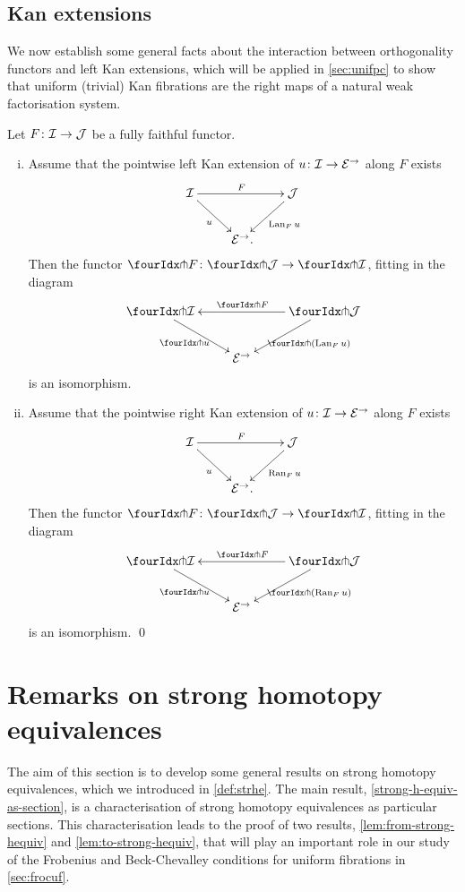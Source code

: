 \documentclass[reqno,10pt,a4paper,oneside,draft]{amsart}
\begin{document}
\subsection*{Kan extensions}

We now establish some general facts about the interaction between orthogonality functors and left Kan extensions, which will be applied in \cref{sec:unifpc} to show that uniform (trivial) Kan fibrations are the right maps of a natural weak factorisation system.

\begin{proposition} \label{kan-extension-closure}
Let $F \colon \mathcal{I} \to \mathcal{J}$ be a fully faithful functor.
\begin{enumerate}[(i)]
\item Assume that the pointwise left Kan extension of $u \colon \mathcal{I} \to \mathcal{E}^\to$ along $F$ exists
\[
\xymatrix{
  \cal{I}
  \ar[dr]_{u}
  \ar[rr]^{F}
&&
  \cal{J}
  \ar[dl]^{\Lan_F u}
\\&
  \catE^\to \rlap{.}
}
\]
Then the functor $\liftr{F} \co \liftr{\cal{J}} \to \liftr{\cal{I}}$, fitting in the diagram
\[
\xymatrix{
  \liftr{\cal{I}}
  \ar[dr]_{\liftr{u}}
&&
  \liftr{\cal{J}}
  \ar[ll]_{\liftr{F}}
  \ar[dl]^{\liftr{(\Lan_F u)}}
\\&
  \catE^\to
}
\]
is an isomorphism.
\item Assume that the pointwise right Kan extension of $u \colon \mathcal{I} \to \mathcal{E}^\to$ along $F$ exists
\[
\xymatrix{
  \cal{I}
  \ar[dr]_{u}
  \ar[rr]^{F}
&&
  \cal{J}
  \ar[dl]^{\Ran_F u}
\\&
  \catE^\to \rlap{.}
}
\]
Then the functor $\liftl{F} \co \liftl{\cal{J}} \to \liftl{\cal{I}}$, fitting in the diagram
\[
\xymatrix{
  \liftl{\cal{I}}
  \ar[dr]_{\liftl{u}}
&&
  \liftl{\cal{J}}
  \ar[ll]_{\liftl{F}}
  \ar[dl]^{\liftl{(\Ran_F u)}}
\\&
  \catE^\to
}
\]
is an isomorphism.
\qed
\end{enumerate}
\end{proposition}


\section{Remarks on strong homotopy equivalences}
\label{sec:remshe}

The aim of this section is to develop some general results on strong homotopy equivalences, which we introduced in \cref{def:strhe}.
The main result, \cref{strong-h-equiv-as-section}, is a characterisation of strong homotopy equivalences as particular sections.
This characterisation leads to the proof of two results, \cref{lem:from-strong-hequiv} and \cref{lem:to-strong-hequiv}, that will play an important role in our study of the Frobenius and Beck-Chevalley conditions for uniform fibrations in \cref{sec:frocuf}.
\end{document}
